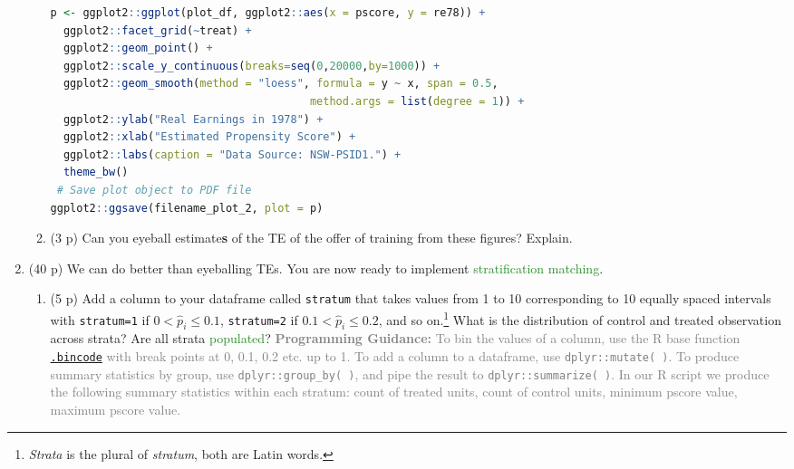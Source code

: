 \documentclass{article}
\begin{document}
\begin{enumerate}[label=\textbf{Q\arabic{enumi}}.,ref=Q\arabic{enumi}, wide=0pt, itemsep=0em, topsep=5pt, labelindent=0pt]
\begin{enumerate}
\begin{lstlisting}[language=R]
p <- ggplot2::ggplot(plot_df, ggplot2::aes(x = pscore, y = re78)) +
  ggplot2::facet_grid(~treat) +
  ggplot2::geom_point() + 
  ggplot2::scale_y_continuous(breaks=seq(0,20000,by=1000)) +
  ggplot2::geom_smooth(method = "loess", formula = y ~ x, span = 0.5, 
                                        method.args = list(degree = 1)) +
  ggplot2::ylab("Real Earnings in 1978") +
  ggplot2::xlab("Estimated Propensity Score") +
  ggplot2::labs(caption = "Data Source: NSW-PSID1.") +
  theme_bw()
 # Save plot object to PDF file
ggplot2::ggsave(filename_plot_2, plot = p)
\end{lstlisting}
\item (3 p) Can you eyeball estimate\textbf{s} of the TE of the offer of training from these figures? Explain.  
\end{enumerate}

\item (40 p) We can do better than eyeballing TEs. You are now ready to implement \textcolor{ForestGreen}{stratification matching}.

\begin{enumerate}
\item (5 p) Add a column to your dataframe called \texttt{stratum} that takes values from 1 to 10 corresponding to 10 equally spaced intervals with \texttt{stratum=1} if $0<\widehat{p}_{i}\leq 0.1$, \texttt{stratum=2} if $0.1<\widehat{p}_{i}\leq 0.2$, and so on.\footnote{\textit{Strata} is the plural of \textit{stratum}, both are Latin words.} What is the distribution of control and treated observation across strata? Are all strata \textcolor{ForestGreen}{populated}? \textcolor{gray}{\textbf{Programming Guidance:} To bin the values of a column, use the R base function \href{https://www.rdocumentation.org/packages/base/versions/3.6.2/topics/.bincode( )}{\texttt{.bincode}} with break points at 0, 0.1, 0.2 etc. up to 1. To add a column to a dataframe, use \texttt{dplyr::mutate( )}. To produce summary statistics by group, use \texttt{dplyr::group\_by( )}, and pipe the result to \texttt{dplyr::summarize( )}. In our R script we produce the following summary statistics within each stratum: count of treated units, count of control units, minimum pscore value, maximum pscore value.}


\end{enumerate}
\end{enumerate}
\end{document}
